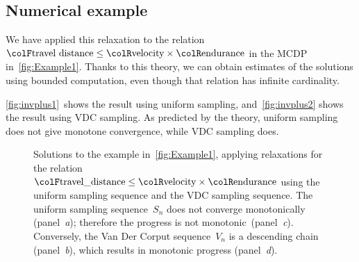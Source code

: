 \subsection{Numerical example}

We have applied this relaxation to the relation ${\colF\text{travel distance}}\leq{\colR\text{velocity}}\times{\colR\text{endurance}}$ in the MCDP in~\cref{fig:Example1}. Thanks to this theory, we can obtain estimates of the solutions using bounded computation, even though that relation has infinite cardinality.

\cref{fig:invplus1}~shows the result using uniform sampling,
and~\cref{fig:invplus2} shows the result using VDC sampling.
As predicted by the theory, uniform sampling does not give monotone
convergence, while VDC sampling does.
\begin{figure}[t]
    \centering
    \centering

    \caption{Solutions to the example in~\cref{fig:Example1}, applying relaxations
    for the relation ${\colF\text{travel\_distance}}\leq{\colR\text{velocity}}\times{\colR\text{endurance}}$
        using the uniform sampling sequence and the VDC sampling sequence.
        The uniform sampling sequence~$S_{n}$ does not converge monotonically
        (panel~\emph{a}); therefore the progress is not monotonic~(panel\emph{~c}).
        Conversely, the Van Der Corput sequence~$V_{n}$ is a descending
        chain (panel~\emph{b}), which results in monotonic progress (panel~\emph{d}).}
\end{figure}


